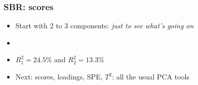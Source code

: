 \begin{frame}\frametitle{SBR: scores}
	
	\begin{itemize}
		\item	Start with 2 to 3 components: \emph{just to see what's going on}
		
		\item	{}
		
		\item	\( R^2_1 = 24.5\% \) and \( R^2_2 = 13.3\% \)

		
		\item	Next: scores, loadings, SPE, \( T^2 \): all the usual PCA tools
		
	\end{itemize}

\end{frame}

